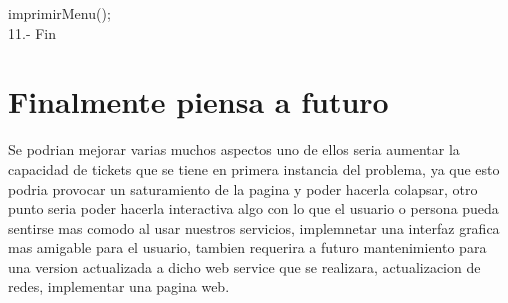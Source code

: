\documentclass[30pt]{article}
\theoremstyle{definition}
\begin{document}
  \hspace{2cm} imprimirMenu();\\
  
11.- Fin


\newpage    
\section{Finalmente piensa a futuro}

{\large Se podrian mejorar varias muchos aspectos uno de ellos seria aumentar la capacidad de tickets que se tiene en primera instancia del problema, ya que esto podria provocar un saturamiento de la pagina y poder hacerla colapsar, otro punto seria poder hacerla interactiva algo con lo que el usuario o persona pueda sentirse mas comodo al usar nuestros servicios, implemnetar una interfaz grafica mas amigable para el usuario, tambien requerira a futuro mantenimiento para una version actualizada a dicho web service que se realizara, actualizacion de redes, implementar una pagina web. } 
\end{document}
